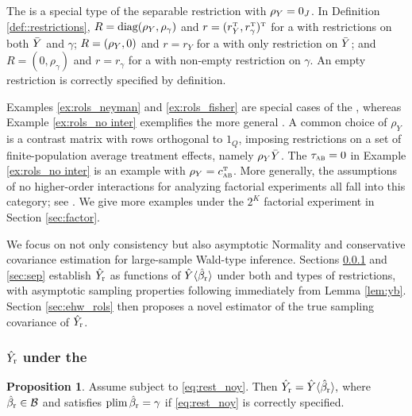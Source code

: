 \documentclass[11pt]{article}
\theoremstyle{definition}
\newtheorem{proposition}{Proposition}
\begin{document}
\medskip

The {\gor} is a special type of the separable restriction with $\rho_Y  =0_J$. 
In Definition \ref{def::restrictions}, $R = \text{diag}(\rho_Y, \rho_\gamma)$ and $r = (r_Y^{ \mathrm{\scriptscriptstyle T} } , r_\gamma^{ \mathrm{\scriptscriptstyle T} })^{ \mathrm{\scriptscriptstyle T} }$ for a {\sor} with restrictions on both $\bar Y$ and $\gamma$; 
$R = (\rho_Y,0)$ and $r = r_Y$ for a {\sor}  with only restriction on $\bar Y$; and 
$R  = (0, \rho_\gamma)$ and $r = r_\gamma$ for a {\gor} with non-empty restriction on $\gamma$. An empty restriction is correctly specified by definition.




 
Examples \ref{ex:rols_neyman} and \ref{ex:rols_fisher} are special cases of the {\gor}, whereas Example \ref{ex:rols_no inter} exemplifies the more general {\sr}. A common choice of $\rho_Y$ is a contrast matrix with rows orthogonal to $1_Q$, imposing restrictions on a set of finite-population average treatment effects, namely $\rho_Y\bar Y$.  The $\tau_{\textsc{ab}}= 0$ in Example \ref{ex:rols_no inter} is an example with $\rho_Y = c_{\textsc{ab}}^{ \mathrm{\scriptscriptstyle T} }$. More generally, the assumptions of no higher-order interactions for analyzing factorial experiments all fall into this category; see \cite{ZDa}. 
We give more examples under the $2^K$ factorial experiment in Section \ref{sec:factor}.





We focus on not only consistency but also asymptotic Normality and conservative covariance estimation for large-sample Wald-type inference.
Sections \ref{sec:noy} and \ref{sec:sep} establish
 $\hat Y_{\textup{r}}$ as functions of $\hat Y\langle \hat\beta_{\textup{r}}\rangle $ under both {\go} and {\so} types of restrictions, 
with asymptotic sampling properties following immediately from Lemma \ref{lem:yb}. 
Section \ref{sec:ehw_rols} then proposes a novel estimator of the true sampling covariance of $\hat Y_{\textup{r}} $. 








\subsubsection{$\hat Y_{\textup{r}} $ under the {\gor}}
\label{sec:noy}




\begin{proposition}\label{prop:noy}
Assume \rlss subject to \eqref{eq:rest_noy}. Then 
$
\hat Y_{\textup{r}}   =    \hat Y\langle \hat\beta_{\textup{r}}\rangle ,
$
where $\hat\beta_{\textup{r}}\in\mathcal{B}$ and satisfies $\textup{plim\,} \hat\beta_{\textup{r}} = \gamma$  if \eqref{eq:rest_noy} is correctly specified.
\end{proposition}
\end{document}

